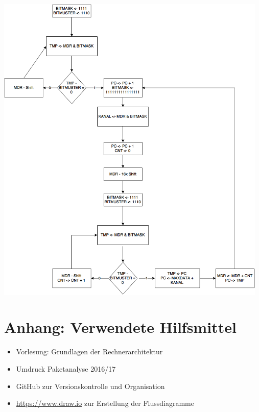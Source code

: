 \documentclass[12pt,titlepage,german,a4]{article}
\begin{document}
	\includegraphics[width=13cm]{algoComplete.png}

	\newpage
    \section{Anhang: Verwendete Hilfsmittel}
	\begin{itemize}
		\item Vorlesung: Grundlagen der Rechnerarchitektur
		\item Umdruck Paketanalyse 2016/17
		\item GitHub zur Versionskontrolle und Organisation
		\item \url{https://www.draw.io} zur Erstellung der Flussdiagramme
	\end{itemize}
\end{document}
